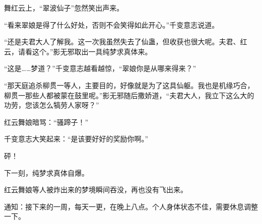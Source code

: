 \begin{this_body}
舞红云上，“翠波仙子”忽然笑出声来。

“看来翠娘是得了什么好处，否则不会笑得如此开心。”千变意志说道。

“还是夫君大人了解我。这一次我虽然失去了仙蛊，但收获也很大呢。夫君、红云，请看这个。”影无邪取出一具纯梦求真体来。

“这是……梦道？”千变意志越看越惊，“翠娘你是从哪来得来？”

“那天庭追杀柳贯一等人，主要目的，好像就是为了这具仙躯。我也是机缘巧合，柳贯一那些人都被蒙在鼓里呢。”影无邪随后撒娇道，“夫君大人，我立下这么大的功劳，您该怎么犒劳人家呀？”

红云舞娘暗骂：“骚蹄子！”

千变意志大笑起来：“是该要好好的奖励你啊。”

砰！

下一刻，纯梦求真体自爆。

红云舞娘等人被炸出来的梦境瞬间吞没，再也没有飞出来。

通知：接下来的一周，每天一更，在晚上八点。个人身体状态不佳，需要休息调整一下。

\end{this_body}

